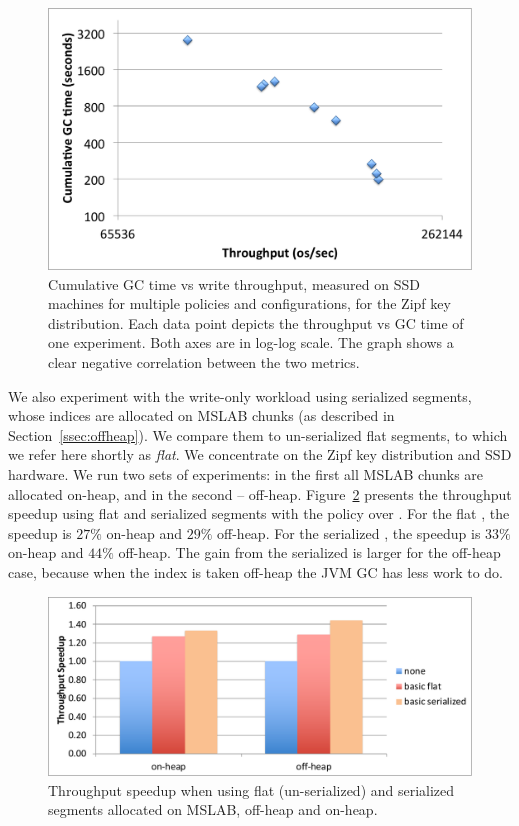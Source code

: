 \begin{figure}[htb]
\includegraphics[width=\figw]{Figs/gc-throughput-log2.png}
\caption{Cumulative GC time vs write throughput, measured on SSD machines 
for multiple \sys\/ policies and configurations, for the Zipf  key distribution. Each data point 
depicts the throughput vs GC time of one experiment. Both axes are in log-log scale.  
The graph shows a clear negative correlation between the two metrics. 
}
\label{fig:gc-throughput-log2}
\end{figure}

We also experiment with the write-only workload using serialized segments, whose indices are allocated on  MSLAB chunks
(as described in Section~\ref{ssec:offheap}). We compare them to un-serialized flat segments, to which we refer here 
shortly as \emph{flat}.
We concentrate on the Zipf key distribution and  SSD hardware. We run two sets of experiments: in the first  all MSLAB chunks are allocated on-heap, and in the second --  off-heap. Figure~\ref{fig:write_only_off_heap} presents the throughput speedup using flat and serialized 
segments with the \basic\/ policy over \none. For the flat \basic, the speedup is $27\%$ on-heap and $29\%$ off-heap. For the serialized \basic, the speedup is $33\%$ on-heap and $44\%$ off-heap. The gain from the serialized \basic\/ is larger for the off-heap case, because when 
the index is taken off-heap the JVM GC has less work to do. 

\begin{figure}[htb]
\includegraphics[width=\figw]{Figs/write-only-off-heap.pdf}
\caption{Throughput speedup when using flat (un-serialized) and serialized segments allocated on MSLAB, off-heap and on-heap.
}
\label{fig:write_only_off_heap}
\end{figure}


